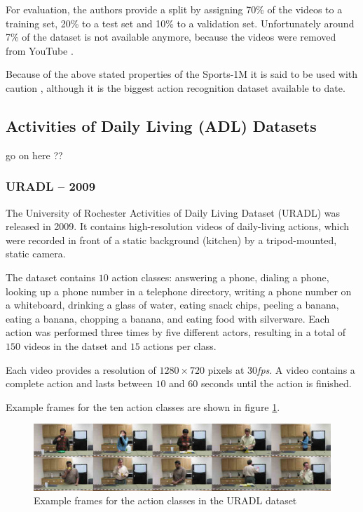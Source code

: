 For evaluation, the authors provide a split by assigning 70\% of the videos to a training set, 20\% to a test set and 10\% to a validation set.
Unfortunately around 7\% of the dataset is not available anymore, because the videos were removed from YouTube \cite{ng_beyond_2015}.

Because of the above stated properties of the Sports-1M it is said to be used with caution \cite{kang_review_2016}, although it is the biggest action recognition dataset available to date.

%


\subsection{Activities of Daily Living (ADL) Datasets}

go on here ??

\subsubsection{URADL -- 2009}
The University of Rochester Activities of Daily Living Dataset (URADL) \cite{messing_activity_2009} was released in 2009.
It contains high-resolution videos of daily-living actions, which were recorded in front of a static background (kitchen) by a tripod-mounted, static camera.

The dataset contains $10$ action classes: answering a phone, dialing a phone, looking up a phone number in a telephone directory, writing a phone number on a whiteboard, drinking a glass of water, eating snack chips, peeling a banana, eating a banana, chopping a banana, and eating food with silverware.
Each action was performed three times by five different actors, resulting in a total of $150$ videos in the datset and $15$ actions per class.

Each video provides a resolution of $1280 \times 720$ pixels at $30$\textit{fps}.
A video contains a complete action and lasts between $10$ and $60$ seconds until the action is finished.

Example frames for the ten action classes are shown in figure \ref{fig:uradl_example}.
\begin{figure}[H]
    \centering
    \includegraphics[width=\textwidth]{img_datasets/uradl_example}
    \caption{Example frames for the action classes in the URADL dataset \cite{_university_????}}
    \label{fig:uradl_example}
\end{figure}


